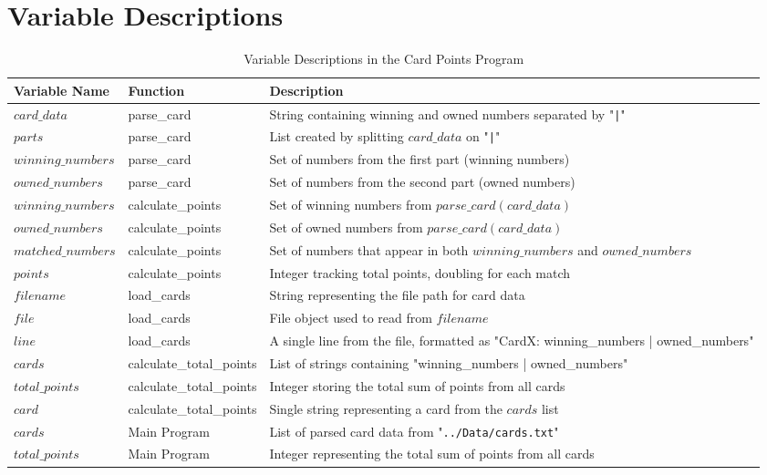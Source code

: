 \documentclass{article}
\begin{document}
\section*{Variable Descriptions}
\begin{table}[h]
    \centering
    \begin{tabular}{p{4cm} p{4cm} p{7cm}} %
        \toprule
        \textbf{Variable Name} & \textbf{Function} & \textbf{Description} \\
        \midrule
        $card\_data$ & parse\_card & String containing winning and owned numbers separated by "\texttt{|}" \\
        $parts$ & parse\_card & List created by splitting $card\_data$ on "\texttt{|}" \\
        $winning\_numbers$ & parse\_card & Set of numbers from the first part (winning numbers) \\
        $owned\_numbers$ & parse\_card & Set of numbers from the second part (owned numbers) \\
        $winning\_numbers$ & calculate\_points & Set of winning numbers from $parse\_card(card\_data)$ \\
        $owned\_numbers$ & calculate\_points & Set of owned numbers from $parse\_card(card\_data)$ \\
        $matched\_numbers$ & calculate\_points & Set of numbers that appear in both $winning\_numbers$ and $owned\_numbers$ \\
        $points$ & calculate\_points & Integer tracking total points, doubling for each match \\
        $filename$ & load\_cards & String representing the file path for card data \\
        $file$ & load\_cards & File object used to read from $filename$ \\
        $line$ & load\_cards & A single line from the file, formatted as "CardX: winning\_numbers | owned\_numbers" \\
        $cards$ & calculate\_total\_points & List of strings containing "winning\_numbers | owned\_numbers" \\
        $total\_points$ & calculate\_total\_points & Integer storing the total sum of points from all cards \\
        $card$ & calculate\_total\_points & Single string representing a card from the $cards$ list \\
        $cards$ & Main Program & List of parsed card data from "\texttt{../Data/cards.txt}" \\
        $total\_points$ & Main Program & Integer representing the total sum of points from all cards \\
        \bottomrule
    \end{tabular}
    \caption{Variable Descriptions in the Card Points Program}
    \label{tab:variables}
\end{table}
\end{document}
